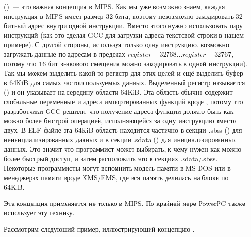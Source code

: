 
\label{MIPS_GP}

 ()~--- это важная концепция в MIPS.
Как мы уже возможно знаем, каждая инструкция в MIPS имеет размер 32 бита, поэтому невозможно
закодировать 32-битный адрес внутри одной инструкции. Вместо этого нужно использовать пару инструкций
(как это сделал GCC для загрузки адреса текстовой строки в нашем примере).
С другой стороны, используя только одну инструкцию, 
возможно загружать данные по адресам в пределах $register-32768...register+32767$, потому что 16 бит
знакового смещения можно закодировать в одной инструкции).
Так мы можем выделить какой-то регистр для этих целей и ещё выделить буфер в 64KiB для самых 
частоиспользуемых данных.
Выделенный регистр называется  () и он указывает на середину
области 64KiB.
Эта область обычно содержит глобальные переменные и адреса импортированных функций вроде \printf,
потому что разработчики GCC решили, что получение адреса функции должно быть как можно более быстрой операцией,
исполняющейся за одну инструкцию вместо двух.
В ELF-файле эта 64KiB-область находится частично в секции .sbss () для неинициализированных
данных и в секции .sdata () для инициализированных данных.
Это значит что программист может выбирать, к чему нужен как можно более быстрый доступ, и затем расположить
это в секциях .sdata/.sbss.
Некоторые программисты  могут вспомнить модель памяти в MS-DOS  
или в менеджерах памяти вроде XMS/EMS, где вся память делилась на блоки по 64KiB.

Эта концепция применяется не только в MIPS. По крайней мере PowerPC также использует эту технику.


Рассмотрим следующий пример, иллюстрирующий концепцию .



